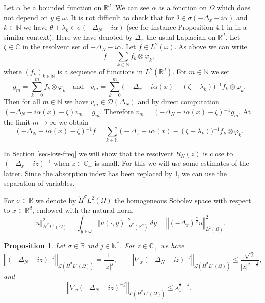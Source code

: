 \documentclass[10pt, a4paper,reqno]{amsart}
\theoremstyle{plain}
\newtheorem{proposition}[theorem]{Proposition}
\theoremstyle{definition}
\theoremstyle{remark}
\begin{document}
Let ${\alpha}$ be a bounded function on ${\mathbb{R}}^d$. We can see ${\alpha}$ as a fonction on ${\Omega}$ which does not depend on $y \in {\omega}$. It is not difficult to check that for ${\theta} \in {\sigma}(-{{\Delta}_x} -i{\alpha})$ and $k \in {\mathbb{N}}$ we have ${\theta} + {\lambda}_k \in {\sigma}(-{{\Delta}_N} -i{\alpha})$ (see for instance Proposition 4.1 in \cite{royer-diss-schrodinger-guide} in a similar context). Here we have denoted by ${{\Delta}_x}$ the usual Laplacian on ${\mathbb{R}}^d$. Let ${\zeta} \in {\mathbb{C}}$ in the resolvent set of $-{{\Delta}_N} -i{\alpha}$. Let $f \in L^2({\omega})$. As above we can write  
\begin{equation} \label{def-fk}
f = \sum_{k\in{\mathbb{N}}} f_k \otimes {\varphi}_k,
\end{equation}
where ${\left({f}_{k}\right)_{k \in{\mathbb{N}}}}$ is a sequence of functions in $L^2({\mathbb{R}}^d)$. 
For $m \in {\mathbb{N}}$ we set 
\[
g_m = \sum_{k = 0}^m f_k \otimes {\varphi}_k \quad \text{and} \quad v_m = \sum_{k =0}^m \big(-{{\Delta}_x}  - i {\alpha}(x) - ({\zeta} - {\lambda}_k) \big){^{-1}} f_k \otimes {\varphi}_k.
\]
Then for all $m \in {\mathbb{N}}$ we have $v_m \in {{\mathcal D}}({{\Delta}_N})$ and by direct computation $(-{{\Delta}_N} -i{\alpha}(x) - {\zeta}) v_m = g_m$. Therefore $v_m = (-{{\Delta}_N} -i{\alpha}(x) - {\zeta}) {^{-1}} g_m$. At the limit $m \to \infty$ we obtain 
\begin{equation} \label{res-sep-variables}
(-{{\Delta}_N}-i{\alpha}(x)-{\zeta}){^{-1}} f = \sum_{k \in {\mathbb{N}}} \big(-{{\Delta}_x}  - i {\alpha}(x) - ({\zeta} - {\lambda}_k) \big){^{-1}} f_k \otimes {\varphi}_k.
\end{equation}

In Section \ref{sec-low-freq} we will show that the resolvent ${R_N(z)}$ is close to $(-{{\Delta}_x}-iz){^{-1}}$ when $z \in {\mathbb{C}}_+$ is small. For this we will use some estimates of the latter. Since the absorption index has been replaced by 1, we can use the separation of variables.

For ${\sigma} \in {\mathbb{R}}$ we denote by $\dot H^{\sigma} L^2({\Omega})$ the homogeneous Sobolev space with respect to $x \in {\mathbb{R}}^d$, endowed with the natural norm 
\[
{\left\Vert {u}\right\Vert}_{\dot H^{\sigma} L^2({\Omega})}^2 = \int_{y \in {\omega}} {\left\Vert {u(\cdot,y)}\right\Vert}_{\dot H^{\sigma}({\mathbb{R}}^d)}^2 \, dy = {\left\Vert {(-{{\Delta}_x})^{\frac {\sigma} 2} u}\right\Vert}_{L^2({\Omega})}^2.
\]

\begin{proposition} \label{prop-res-heat}
Let ${\sigma} \in {\mathbb{R}}$ and $j \in {\mathbb{N}}^*$. For $z \in {\mathbb{C}}_+$ we have 
\[
{\left\Vert {(-{{\Delta}_N} -iz)^{-j}}\right\Vert}_{{{\mathcal L}}(\dot H^{\sigma} L^2({\Omega}))} = \frac {1}{{\left\vert z\right\vert}^j}, \qquad {\left\Vert {\nabla_x (-{{\Delta}_N} -iz)^{-j}}\right\Vert}_{{{\mathcal L}}(\dot H^{\sigma} L^2({\Omega}))} {\leqslant} \frac {\sqrt 2}{{\left\vert z\right\vert}^{j-\frac 12}},
\]
and
\[
{\left\Vert {\nabla_y (-{{\Delta}_N} -iz)^{-j}}\right\Vert}_{{{\mathcal L}}(\dot H^{\sigma} L^2({\Omega}))} {\leqslant} {\lambda}_1^{\frac 12 -j}.
\]
\end{proposition}
\end{document}
